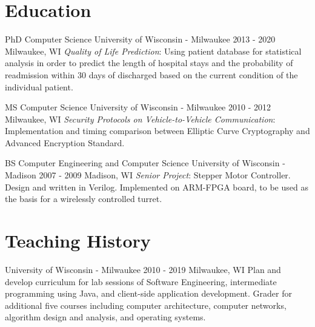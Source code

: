 \documentclass[]{clean-resume}
\begin{document}
\section{Education}

\entry
	{PhD Computer Science}
	{University of Wisconsin - Milwaukee}
	{2013 - 2020}
	{Milwaukee, WI}
	{
		\emph{Quality of Life Prediction}: Using patient database for statistical analysis in order to predict the length of hospital stays and the probability of readmission within 30 days of discharged based on the current condition of the individual patient.
	}

\entry
	{MS Computer Science}
	{University of Wisconsin - Milwaukee}
	{2010 - 2012}
	{Milwaukee, WI}
	{
		\emph{Security Protocols on Vehicle-to-Vehicle Communication}: Implementation and timing comparison between Elliptic Curve Cryptography and Advanced Encryption Standard.
	}

\entry
	{BS Computer Engineering and Computer Science}
	{University of Wisconsin - Madison}
	{2007 - 2009}
	{Madison, WI}
	{
		\emph{Senior Project}: Stepper Motor Controller. Design and written in Verilog. Implemented on 
		ARM-FPGA board, to be used as the basis for a wirelessly controlled turret.
	}

\section{Teaching History}

\entry
	{University of Wisconsin - Milwaukee}
	{}
	{2010 - 2019}
	{Milwaukee, WI}
	{
		Plan and develop curriculum for lab sessions of Software Engineering, intermediate programming using Java, and client-side application development. Grader for additional five courses including computer architecture, computer networks, algorithm design and analysis, and operating systems.
	}
\end{document}
